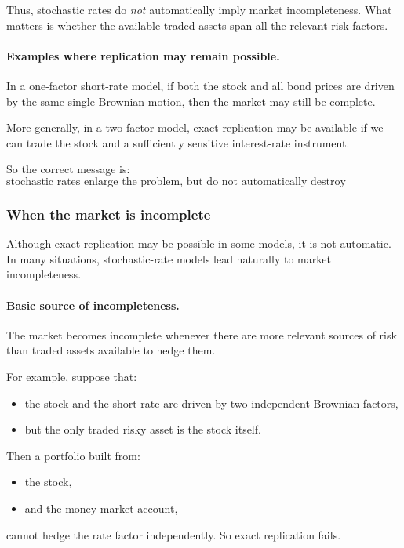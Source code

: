 \documentclass[11pt]{article}
\theoremstyle{plain}
\theoremstyle{definition}
\theoremstyle{remark}
\begin{document}
Thus, stochastic rates do \emph{not} automatically imply market
incompleteness.
What matters is whether the available traded assets span all the
relevant risk factors.

\paragraph{Examples where replication may remain possible.}
In a one-factor short-rate model, if both the stock and all bond prices
are driven by the same single Brownian motion, then the market may still
be complete.

More generally, in a two-factor model, exact replication may be
available if we can trade the stock and a sufficiently sensitive
interest-rate instrument.

So the correct message is:
\[
\boxed{
\text{stochastic rates enlarge the problem, but do not automatically
destroy replication.}
}
\]

\subsubsection{When the market is incomplete}

Although exact replication may be possible in some models, it is not
automatic.
In many situations, stochastic-rate models lead naturally to market
incompleteness.

\paragraph{Basic source of incompleteness.}
The market becomes incomplete whenever there are more relevant sources of
risk than traded assets available to hedge them.

For example, suppose that:
\begin{itemize}[leftmargin=1.4em]
    \item the stock and the short rate are driven by two independent
    Brownian factors,
    \item but the only traded risky asset is the stock itself.
\end{itemize}

Then a portfolio built from:
\begin{itemize}[leftmargin=1.4em]
    \item the stock,
    \item and the money market account,
\end{itemize}
cannot hedge the rate factor independently.
So exact replication fails.
\end{document}
